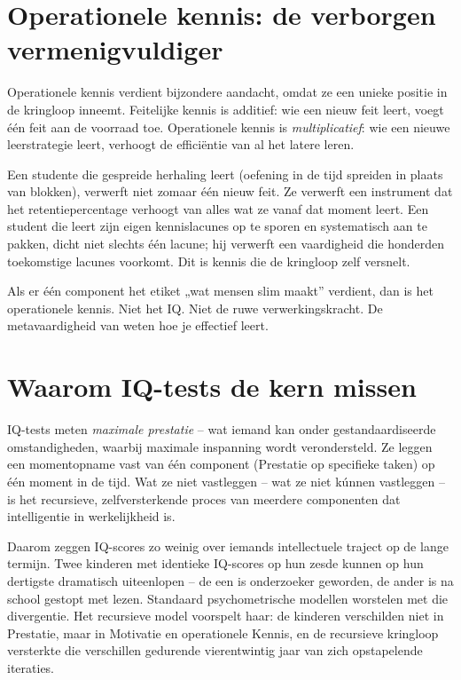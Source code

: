 \documentclass[11pt, twoside, openright]{book}
\begin{document}
\section*{Operationele kennis: de verborgen vermenigvuldiger}

Operationele kennis verdient bijzondere aandacht, omdat ze een unieke positie in de kringloop inneemt. Feitelijke kennis is additief: wie een nieuw feit leert, voegt één feit aan de voorraad toe. Operationele kennis is \textit{multiplicatief}: wie een nieuwe leerstrategie leert, verhoogt de efficiëntie van al het latere leren.

Een studente die gespreide herhaling leert (oefening in de tijd spreiden in plaats van blokken), verwerft niet zomaar één nieuw feit. Ze verwerft een instrument dat het retentiepercentage verhoogt van alles wat ze vanaf dat moment leert. Een student die leert zijn eigen kennislacunes op te sporen en systematisch aan te pakken, dicht niet slechts één lacune; hij verwerft een vaardigheid die honderden toekomstige lacunes voorkomt. Dit is kennis die de kringloop zelf versnelt.

Als er één component het etiket „wat mensen slim maakt” verdient, dan is het operationele kennis. Niet het IQ. Niet de ruwe verwerkingskracht. De metavaardigheid van weten hoe je effectief leert.

\section*{Waarom IQ-tests de kern missen}

IQ-tests meten \textit{maximale prestatie} -- wat iemand kan onder gestandaardiseerde omstandigheden, waarbij maximale inspanning wordt verondersteld. Ze leggen een momentopname vast van één component (Prestatie op specifieke taken) op één moment in de tijd. Wat ze niet vastleggen -- wat ze niet kúnnen vastleggen -- is het recursieve, zelfversterkende proces van meerdere componenten dat intelligentie in werkelijkheid is.

Daarom zeggen IQ-scores zo weinig over iemands intellectuele traject op de lange termijn. Twee kinderen met identieke IQ-scores op hun zesde kunnen op hun dertigste dramatisch uiteenlopen -- de een is onderzoeker geworden, de ander is na school gestopt met lezen. Standaard psychometrische modellen worstelen met die divergentie. Het recursieve model voorspelt haar: de kinderen verschilden niet in Prestatie, maar in Motivatie en operationele Kennis, en de recursieve kringloop versterkte die verschillen gedurende vierentwintig jaar van zich opstapelende iteraties.
\end{document}
